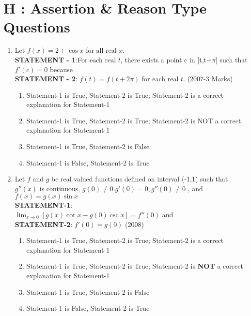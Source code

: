 \documentclass[journal,,12pt,twocolumn]{IEEEtran}
\theoremstyle{remark}
\begin{document}
\section*{H : Assertion \& Reason Type Questions}
\begin{enumerate}
    \item Let $f(x)=2 + \cos{x}$ for all real $x$.\\
    \textbf{STATEMENT - 1}:For each real $t$, there exists a point c in [t,t+$\pi$] such that $f'(c)=0$ because \\
    \textbf{STATEMENT - 2}: $f(t)=f(t+2\pi)$ for each real $t$.
    \hfill{(2007-3 Marks)}
    \begin{enumerate}
    
        
    
        \item Statement-1 is True, Statement-2 is True; Statement-2 is a correct explanation for Statement-1
        \item Statement-1 is True, Statement-2 is True; Statement-2 is NOT a correct explanation for Statement-1
        \item Statement-1 is True, Statement-2 is False 
        \item Statement-1 is False, Statement-2 is True
        
    \end{enumerate}
\item Let $f$ and $g$ be real valued functions defined on interval (-1,1) such that $g''(x)$ is continuous, $g(0)\neq0$.$g'(0)=0, g''(0)\neq0$ , and $f(x)=g(x)\sin{x}$\\
\textbf{STATEMENT-1}:\\
$\lim _{x \to 0}[g(x)\cot{x}-g(0)\csc{x}]=f''(0)$ and\\
\textbf{STATEMENT-2}: $f'(0)=g(0)$
\hfill{(2008)}
\begin{enumerate}

    

        \item Statement-1 is True, Statement-2 is True; Statement-2 is a correct explanation for Statement-1
        \item Statement-1 is True, Statement-2 is True; Statement-2 is \textbf{NOT} a correct explanation for Statement-1
        \item Statement-1 is True, Statement-2 is False 
        \item Statement-1 is False, Statement-2 is True
        
    \end{enumerate}
\end{enumerate}
\end{document}
